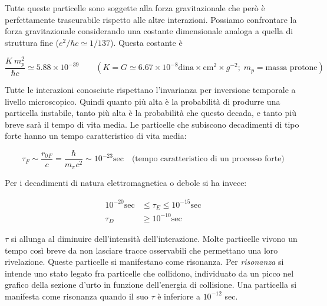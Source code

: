 Tutte queste particelle sono soggette alla forza gravitazionale che però è
perfettamente trascurabile rispetto alle altre interazioni. Possiamo confrontare
la forza gravitazionale considerando una costante dimensionale analoga a quella
di struttura fine ($e^2/\hbar c \simeq 1/137$). Questa costante è

\begin{equation*}
\dfrac{K \ m^2_p}{\hbar c} \simeq 5.88 \times 10^{-39} \qquad (K = G \simeq 6.67
\times 10^{-8} \text{dina} \times \text{cm}^2 \times g^{-2};\; m_p = \text{massa
protone})
\end{equation*}

Tutte le interazioni conosciute rispettano l'invarianza per inversione temporale
a livello microscopico. Quindi quanto più alta è la probabilità di produrre 
una
particella instabile, tanto più alta è la probabilità che questo decada, e 
tanto
più breve sarà il tempo di vita media. Le particelle che subiscono decadimenti
di tipo forte hanno un tempo caratteristico di vita media:

\begin{equation*}
\tau_F \sim \dfrac{r{_0{_F}}}{c} = \dfrac{\hbar}{m_\pi c^2} \sim 10^{-23}
\text{sec} \quad \text{(tempo caratteristico di un processo forte)}
\end{equation*}

Per i decadimenti di natura elettromagnetica o debole si ha invece:

\begin{align*}
  10^{-20} \text{sec} &\le \tau_E \le 10^{-15} \text{sec} \\
  \tau_D &\ge 10^{-10} \text{sec}
\end{align*}

$\tau$ si allunga al diminuire dell'intensità dell'interazione. Molte 
particelle
vivono un tempo così breve da non lasciare tracce osservabili che permettano 
una
loro rivelazione. Queste particelle si manifestano come risonanza. Per
\textit{risonanza} si intende uno stato legato fra particelle che collidono,
individuato da un picco nel grafico della sezione d'urto in funzione
dell'energia di collisione. Una particella si manifesta come risonanza quando il
suo $\tau$ è inferiore a $10^{-12}$ sec.


